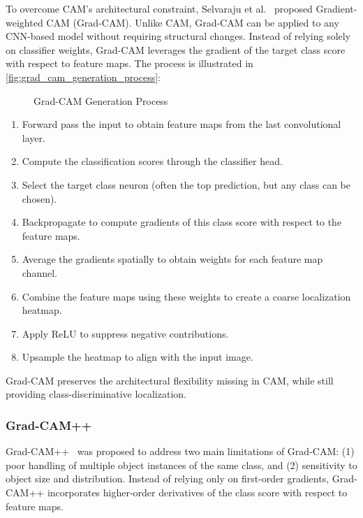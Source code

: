 To overcome CAM's architectural constraint, Selvaraju et al.~\cite{cam_grad} proposed Gradient-weighted CAM (Grad-CAM). Unlike CAM, Grad-CAM can be applied to any CNN-based model without requiring structural changes. Instead of relying solely on classifier weights, Grad-CAM leverages the gradient of the target class score with respect to feature maps. The process is illustrated in \autoref{fig:grad_cam_generation_process}:

\begin{figure}[htbp]
    \centering
    \caption{Grad-CAM Generation Process}
    \label{fig:grad_cam_generation_process}
\end{figure}

\begin{enumerate}
    \item Forward pass the input to obtain feature maps from the last convolutional layer.
    \item Compute the classification scores through the classifier head.
    \item Select the target class neuron (often the top prediction, but any class can be chosen).
    \item Backpropagate to compute gradients of this class score with respect to the feature maps.
    \item Average the gradients spatially to obtain weights for each feature map channel.
    \item Combine the feature maps using these weights to create a coarse localization heatmap.
    \item Apply ReLU to suppress negative contributions.
    \item Upsample the heatmap to align with the input image.
\end{enumerate}

Grad-CAM preserves the architectural flexibility missing in CAM, while still providing class-discriminative localization.

\subsubsection{Grad-CAM++}
Grad-CAM++~\cite{cam_gradpp} was proposed to address two main limitations of Grad-CAM: (1) poor handling of multiple object instances of the same class, and (2) sensitivity to object size and distribution. Instead of relying only on first-order gradients, Grad-CAM++ incorporates higher-order derivatives of the class score with respect to feature maps.

